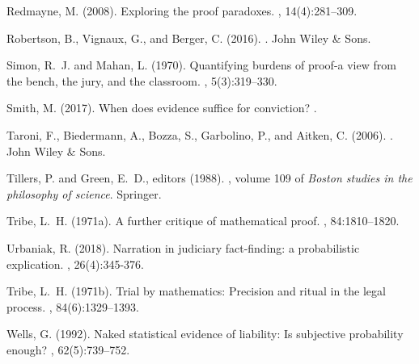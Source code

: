 \documentclass{ifcolog}
\begin{document}
\begin{thebibliography}{}
Redmayne, M. (2008).
\newblock Exploring the proof paradoxes.
, 14(4):281--309.

Robertson, B., Vignaux, G., and Berger, C. (2016).
.
\newblock John Wiley \& Sons.

Simon, R.~J. and Mahan, L. (1970).
\newblock Quantifying burdens of proof-a view from the bench, the jury, and the
  classroom.
, 5(3):319--330.

Smith, M. (2017).
\newblock When does evidence suffice for conviction?
.

Taroni, F., Biedermann, A., Bozza, S., Garbolino, P., and Aitken, C. (2006).
.
\newblock John Wiley \& Sons.

Tillers, P. and Green, E.~D., editors (1988).
, volume 109 of {\em Boston studies in the philosophy
  of science}.
\newblock Springer.

Tribe, L.~H. (1971a).
\newblock A further critique of mathematical proof.
, 84:1810--1820.

Urbaniak, R. (2018).
\newblock Narration in judiciary fact-finding: a probabilistic explication.
, 26(4):345-376.

Tribe, L.~H. (1971b).
\newblock Trial by mathematics: Precision and ritual in the legal process.
, 84(6):1329--1393.



Wells, G. (1992).
\newblock Naked statistical evidence of liability: Is subjective probability
  enough?
, 62(5):739--752.

\end{thebibliography}
\end{document}
